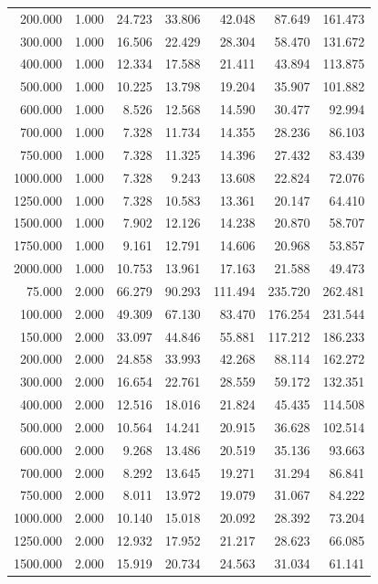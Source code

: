 {\begin{longtable}{rrrrrrr}
200.000 & 1.000 & 24.723 & 33.806 & 42.048 & 87.649 & 161.473 \\
300.000 & 1.000 & 16.506 & 22.429 & 28.304 & 58.470 & 131.672 \\
400.000 & 1.000 & 12.334 & 17.588 & 21.411 & 43.894 & 113.875 \\
500.000 & 1.000 & 10.225 & 13.798 & 19.204 & 35.907 & 101.882 \\
600.000 & 1.000 & 8.526 & 12.568 & 14.590 & 30.477 & 92.994 \\
700.000 & 1.000 & 7.328 & 11.734 & 14.355 & 28.236 & 86.103 \\
750.000 & 1.000 & 7.328 & 11.325 & 14.396 & 27.432 & 83.439 \\
1000.000 & 1.000 & 7.328 & 9.243 & 13.608 & 22.824 & 72.076 \\
1250.000 & 1.000 & 7.328 & 10.583 & 13.361 & 20.147 & 64.410 \\
1500.000 & 1.000 & 7.902 & 12.126 & 14.238 & 20.870 & 58.707 \\
1750.000 & 1.000 & 9.161 & 12.791 & 14.606 & 20.968 & 53.857 \\
2000.000 & 1.000 & 10.753 & 13.961 & 17.163 & 21.588 & 49.473 \\
75.000 & 2.000 & 66.279 & 90.293 & 111.494 & 235.720 & 262.481 \\
100.000 & 2.000 & 49.309 & 67.130 & 83.470 & 176.254 & 231.544 \\
150.000 & 2.000 & 33.097 & 44.846 & 55.881 & 117.212 & 186.233 \\
200.000 & 2.000 & 24.858 & 33.993 & 42.268 & 88.114 & 162.272 \\
300.000 & 2.000 & 16.654 & 22.761 & 28.559 & 59.172 & 132.351 \\
400.000 & 2.000 & 12.516 & 18.016 & 21.824 & 45.435 & 114.508 \\
500.000 & 2.000 & 10.564 & 14.241 & 20.915 & 36.628 & 102.514 \\
600.000 & 2.000 & 9.268 & 13.486 & 20.519 & 35.136 & 93.663 \\
700.000 & 2.000 & 8.292 & 13.645 & 19.271 & 31.294 & 86.841 \\
750.000 & 2.000 & 8.011 & 13.972 & 19.079 & 31.067 & 84.222 \\
1000.000 & 2.000 & 10.140 & 15.018 & 20.092 & 28.392 & 73.204 \\
1250.000 & 2.000 & 12.932 & 17.952 & 21.217 & 28.623 & 66.085 \\
1500.000 & 2.000 & 15.919 & 20.734 & 24.563 & 31.034 & 61.141 \\

\end{longtable}}
